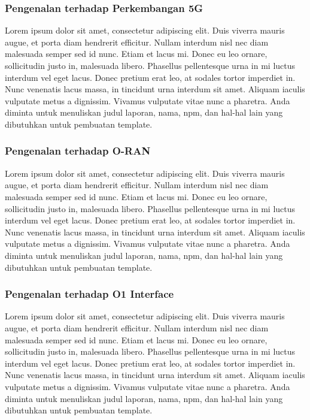     \subsubsection{Pengenalan terhadap Perkembangan 5G}

    Lorem ipsum dolor sit amet, consectetur adipiscing elit. Duis viverra mauris 
    augue, et porta diam hendrerit efficitur. Nullam interdum nisl nec diam 
    malesuada semper sed id nunc. Etiam et lacus mi. Donec eu leo ornare, 
    sollicitudin justo in, malesuada libero. Phasellus pellentesque urna in mi luctus 
    interdum vel eget lacus. Donec pretium erat leo, at sodales tortor imperdiet in. 
    Nunc venenatis lacus massa, in tincidunt urna interdum sit amet. Aliquam iaculis 
    vulputate metus a dignissim. Vivamus vulputate vitae nunc a pharetra.
    Anda diminta untuk menuliskan judul laporan, nama, npm, dan hal-hal lain yang 
    dibutuhkan untuk pembuatan template. 

    \subsubsection{Pengenalan terhadap O-RAN}

    Lorem ipsum dolor sit amet, consectetur adipiscing elit. Duis viverra mauris 
    augue, et porta diam hendrerit efficitur. Nullam interdum nisl nec diam 
    malesuada semper sed id nunc. Etiam et lacus mi. Donec eu leo ornare, 
    sollicitudin justo in, malesuada libero. Phasellus pellentesque urna in mi luctus 
    interdum vel eget lacus. Donec pretium erat leo, at sodales tortor imperdiet in. 
    Nunc venenatis lacus massa, in tincidunt urna interdum sit amet. Aliquam iaculis 
    vulputate metus a dignissim. Vivamus vulputate vitae nunc a pharetra.
    Anda diminta untuk menuliskan judul laporan, nama, npm, dan hal-hal lain yang 
    dibutuhkan untuk pembuatan template. 

    \subsubsection{Pengenalan terhadap O1 Interface}

    Lorem ipsum dolor sit amet, consectetur adipiscing elit. Duis viverra mauris 
    augue, et porta diam hendrerit efficitur. Nullam interdum nisl nec diam 
    malesuada semper sed id nunc. Etiam et lacus mi. Donec eu leo ornare, 
    sollicitudin justo in, malesuada libero. Phasellus pellentesque urna in mi luctus 
    interdum vel eget lacus. Donec pretium erat leo, at sodales tortor imperdiet in. 
    Nunc venenatis lacus massa, in tincidunt urna interdum sit amet. Aliquam iaculis 
    vulputate metus a dignissim. Vivamus vulputate vitae nunc a pharetra.
    Anda diminta untuk menuliskan judul laporan, nama, npm, dan hal-hal lain yang 
    dibutuhkan untuk pembuatan template. 

